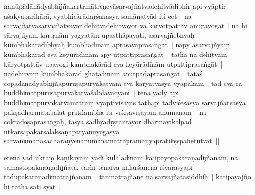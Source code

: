 \documentclass[article,a4paper]{memoir}
\begin{document}
	  \pstart {}\label{thakur75-34.17}nanū\-pā\-dā\-nā\-dyabhijñakartṛmā\-treṇevā\-sarvajñatvadehitvā\-dibhir api vyā\-ptir aśakyaparihā\-rā\-, vyabhicā\-rā\-darśanasya samā\-natvā\-d iti cet | na | sarvajñatvā\-sarvajñatvayor dehitvā\-dehitvayor vā\- kā\-ryotpattā\-v anupayogā\-t | na hi sā\-rvajñyaṃ kartṛṇā\-m yogyatā\-m upasthā\-payati, asarvajñebhyaḥ kumbhakā\-rā\-dibhyaḥ kumbhā\-dī\-nā\-m aprasavaprasaṅgā\-t | nā\-py asā\-rvajñyaṃ kumbhakā\-rā\-d eva keyū\-rā\-dī\-nā\-m apy utpattiprasaṅgā\-t | tathā\- na dehitvaṃ kā\-ryotpattā\-v upayogi kumbhakā\-rā\-d eva keyū\-rā\-dī\-nā\-m utpattiprasaṅgā\-t | nā\-dehitvaṃ kumbhakā\-rā\-d ghaṭā\-dī\-nā\-m anutpā\-daprasaṅgā\-t | tataś copā\-dā\-nā\-dyabhijñapuruṣapū\-rvakatvam eva kā\-ryatvasya vyā\-pakam | tad eva ca buddhimatpuruṣapū\-rvakatvaśabdavā\-cyam | \label{sarit__ratnakīrtinibandhāvali__88081}tena yady api buddhimatpū\-rvakatvamā\-traṃ vyā\-ptiviṣayas tathā\-pi tadviśeṣasya sarvajñatvasya pakṣadharmatā\-balā\-t pratilambha iti viśeṣaviṣayam anumā\-nam | na coktadoṣaprasaṅgaḥ, tasya sā\-dhyadṛṣṭā\-ntayor dharmavikalpā\-d utkarṣā\-pakarṣalakṣaṇaparyanuyogasya sarvā\-numā\-nasā\-dhā\-raṇyenā\-numā\-namā\-traprā\-mā\-ṇyapratikṣepahetutvā\-t ||\label{sarit__ratnakīrtinibandhāvali__88447}
	\pend
      

	  \pstart etena yad uktaṃ kaṇikā\-yā\-ṃ \label{nk-150.9}yadi kulā\-lā\-dī\-nā\-ṃ katipayopakaraṇā\-dijñā\-nam, na samastopakaraṇā\-dijñatā\-, tarhi tenaiva nidarśanena ī\-śvarasyā\-pi \label{ratnakīrtinibandhāvali__36r1NLOHWTQ70VHBU3NJZWC5S9G}tadupakaraṇā\-dimā\-trajñā\-nam | tanmā\-trajñā\-ne na sarvajñatā\-siddhiḥ |\label{ratnakīrtinibandhāvali__36r1NLOHWTQZXFC6755VVL7IPZO} katipayajño hi tathā\- sati syā\-t |
	\pend
      
\end{document}
